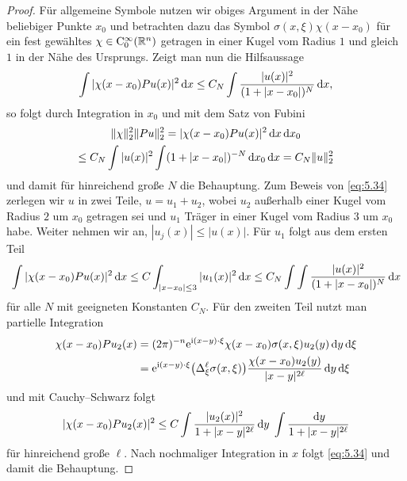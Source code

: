 \begin{proof}
Für allgemeine Symbole nutzen wir obiges Argument in der Nähe beliebiger Punkte $x_0$ und betrachten dazu das Symbol $\sigma(x,\xi)\chi(x-x_0)$ 
für ein fest gewähltes $\chi\in\mathrm C_0^\infty(\mathbb R^n)$ getragen in einer Kugel vom Radius $1$ und gleich $1$ in der Nähe des Ursprungs.
Zeigt man nun die Hilfsaussage
\begin{equation}\label{eq:5.34}
\int |\chi(x-x_0) P u(x) |^2\,\mathrm d x\le C_N \int \frac{|u(x)|^2}{(1+|x-x_0|)^N} \,\mathrm d x,
\end{equation}
so folgt durch Integration in $x_0$ und mit dem Satz von Fubini
\begin{multline}
  \|\chi\|_2^2 \| Pu\|_2^2 = \relax  |\chi(x-x_0) P u(x) |^2\,\mathrm d x \,\mathrm d x_0 \\
  \le C_N \int |u(x)|^2 \int (1+|x-x_0|)^{-N} \,\mathrm d x_0 \,\mathrm d x = C_N \|u\|_2^2
\end{multline}
und damit für hinreichend große $N$ die Behauptung. Zum Beweis von \eqref{eq:5.34} zerlegen wir $u$ in zwei Teile, $u=u_1+u_2$, wobei $u_2$ außerhalb einer Kugel vom Radius $2$ um $x_0$ getragen sei und $u_1$ Träger in einer Kugel vom Radius $3$ um $x_0$ habe. Weiter nehmen wir an, $|u_j(x)|\le |u(x)|$. Für $u_1$ folgt aus dem ersten Teil
\begin{equation}
    \int |\chi(x-x_0) P u(x) |^2\,\mathrm d x \le C \int_{|x-x_0|\le 3} |u_1(x)|^2\,\mathrm d x \le C_N \int \int \frac{|u(x)|^2}{(1+|x-x_0|)^N} \,\mathrm d x
\end{equation}
für alle $N$ mit geeigneten Konstanten $C_N$. Für den zweiten Teil nutzt man partielle Integration
\begin{equation}
\begin{split}
   \chi(x-x_0) Pu_2(x) &= (2\pi)^{-n}  \relax \mathrm e^{\mathrm i (x-y)\cdot\xi} \chi(x-x_0) \sigma(x,\xi) u_2(y)\,\mathrm d y\,\mathrm d\xi \\
   &= \relax \mathrm e^{\mathrm i(x-y)\cdot\xi} \big( \Delta_\xi^\ell \sigma(x,\xi) \big) \frac{\chi(x-x_0) u_2(y)}{|x-y|^{2\ell}} \,\mathrm d y\,\mathrm d\xi
\end{split}
\end{equation}
und mit Cauchy--Schwarz folgt 
\begin{equation}
   |\chi(x-x_0) Pu_2(x)|^2 \le C \int \frac{|u_2(x)|^2}{1+|x-y|^{2\ell}} \,\mathrm d y\; \int \frac{\,\mathrm d y}{1+|x-y|^{2\ell}}
\end{equation}
für hinreichend große $\ell$. Nach nochmaliger Integration in $x$ folgt \eqref{eq:5.34} und damit die Behauptung.
\end{proof}


